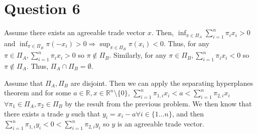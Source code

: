\documentclass[11pt]{article} %
\begin{document}
\section{Question 6}
Assume there exists an agreeable trade vector $x$. Then, $\inf_{\pi \in \Pi_A}\sum_{i=1}^n \pi_ix_i>0$ and $\inf_{\pi \in \Pi_B} \pi(-x_i)>0 \Rightarrow \sup_{\pi \in \Pi_B} \pi(x_i)<0$. Thus, for any $\pi\in \Pi_A, \sum_{i=1}^n \pi_ix_i>0$ so $\pi \notin \Pi_B$. Similarly, for any $\pi\in \Pi_B, \sum_{i=1}^n \pi_ix_i<0$ so $\pi \notin \Pi_A$. Thus, $\Pi_A \cap \Pi_B = \emptyset$.%

Assume that $\Pi_A,\Pi_B$ are disjoint. Then we can apply the separating hyperplanes theorem and for some $a\in\mathbb{R},x \in\mathbb{R}^n\setminus \{0\}$, $\sum_{i=1}^n\pi_{1,i}x_i< a <\sum_{i=1}^n\pi_{2,i}x_i$ $\forall \pi_1 \in \Pi_A,\pi_2 \in \Pi_B$ by the result from the previous problem. We then know that there exists a trade $y$ such that $y_i = x_i-a \forall i \in \{1 \dots n \}$, and then $\sum_{i=1}^n\pi_{1,i}y_i< 0 <\sum_{i=1}^n\pi_{2,i}y_i$ so $y$ is an agreeable trade vector.
\end{document}
